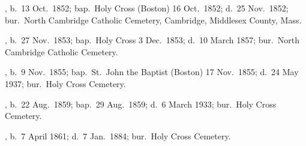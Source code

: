 \begin{Kids}
	, b.\ 13 Oct.\ 1852;\cite{MaryAnn3OBrienBirth} bap.\ Holy Cross (Boston) 16 Oct.\ 1852;\cite{MaryAnn3OBrienBaptism} d.\ 25 Nov.\ 1852;\cite{MaryAnn3OBrienDeath} bur.\ North Cambridge Catholic Cemetery, Cambridge, Middlesex County, Mass.\cite{DianaBerberenaLetter1}
	
	, b.\ 27 Nov.\ 1853;\cite{Ellen3OBrienBirth} bap.\ Holy Cross 3 Dec.\ 1853;\cite{Ellen3OBrienBaptism} d.\ 10 March 1857;\cite{Ellen3OBrienDeath} bur.\ North Cambridge Catholic Cemetery.\cite{DianaBerberenaLetter2}
	
	, b.\ 9 Nov.\ 1855;\cite{AnnMaria3OBrienBirth} bap.\ St.\ John the Baptist (Boston) 17 Nov.\ 1855\cite{AnnMaria3OBrienBaptism}; d.\ 24 May 1937;\cite{AnnMaria3OBrienDeath} bur.\ Holy Cross Cemetery.\cite{CarolGordon}
	
	, b.\ 22 Aug.\ 1859;\cite{Margaret3OBrienBaptism} bap.\ 29 Aug.\ 1859;\cite{Margaret3OBrienBaptism} d.\ 6 March 1933;\cite{Margaret3OBrienDeath} bur.\ Holy Cross Cemetery.\cite{CarolGordon}
	
	, b.\ 7 April 1861;\cite{Edward3OBrienBirth} d.\ 7 Jan.\ 1884;\cite{Edward3OBrienDeath} bur.\ Holy Cross Cemetery.\cite{CarolGordon}
\end{Kids}